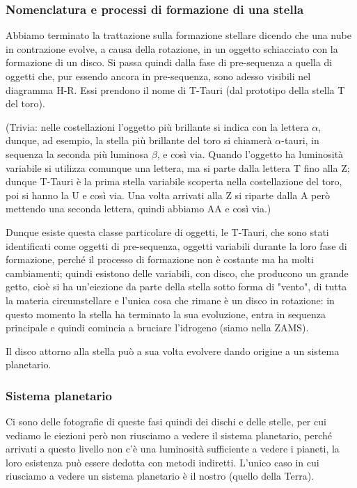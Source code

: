 \subsubsection{Nomenclatura e processi di formazione di una stella}
Abbiamo terminato la trattazione sulla formazione stellare dicendo che una nube in contrazione evolve, a causa della rotazione, in un oggetto schiacciato con la formazione di un disco. Si passa quindi dalla fase di pre-sequenza a quella di oggetti che, pur essendo ancora in pre-sequenza, sono adesso visibili nel diagramma H-R. Essi prendono il nome di T-Tauri (dal prototipo della stella T del toro).

(Trivia: nelle costellazioni l'oggetto più brillante si indica con la lettera $\alpha$, dunque, ad esempio, la stella più brillante del toro si chiamerà $\alpha$-tauri, in sequenza la seconda più luminosa $\beta$, e così via. Quando l'oggetto ha luminosità variabile si utilizza comunque una lettera, ma si parte dalla lettera T fino alla Z; dunque T-Tauri è la prima stella variabile scoperta nella costellazione del toro, poi si hanno la U e così via. Una volta arrivati alla Z si riparte dalla A però mettendo una seconda lettera, quindi abbiamo AA e così via.)

Dunque esiste questa classe particolare di oggetti, le T-Tauri, che sono stati identificati come oggetti di pre-sequenza, oggetti variabili durante la loro fase di formazione, perché il processo di formazione non è costante ma ha molti cambiamenti; quindi esistono delle variabili, con disco, che producono un grande getto, cioè si ha un'eiezione da parte della stella sotto forma di "vento", di tutta la materia circumstellare e l'unica cosa che rimane è un disco in rotazione: in questo momento la stella ha terminato la sua evoluzione, entra in sequenza principale e quindi comincia a bruciare l'idrogeno (siamo nella ZAMS).

Il disco attorno alla stella può a sua volta evolvere dando origine a un sistema planetario.

\subsubsection{Sistema planetario}
Ci sono delle fotografie di queste fasi quindi dei dischi e delle stelle, per cui vediamo le eiezioni però non riusciamo a vedere il sistema planetario, perché arrivati a questo livello non c'è una luminosità sufficiente a vedere i pianeti, la loro esistenza può essere dedotta con metodi indiretti. L'unico caso in cui riusciamo a vedere un sistema planetario è il nostro (quello della Terra).

